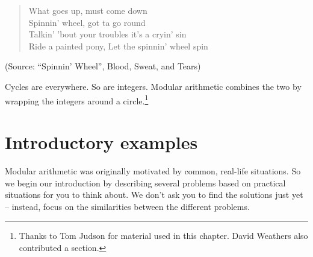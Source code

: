 
\begin{verse}
What goes up, must come down\\
Spinnin' wheel, got ta go round\\
Talkin' 'bout your troubles it's a cryin' sin\\
Ride a painted pony, Let the spinnin' wheel spin
\end{verse}
(Source:  ``Spinnin' Wheel'', Blood, Sweat, and Tears)
\bigskip

Cycles are everywhere. So are integers. Modular arithmetic combines the two by wrapping the integers around a circle.\footnote{Thanks to Tom Judson for material used in this chapter.  David Weathers also contributed a section.}

\section{Introductory examples}\label{sec:Mod.1}
Modular arithmetic was originally motivated by common, real-life situations. So we begin our introduction by describing several problems  based on practical situations for you to think about. We don't ask you to find the solutions just yet -- instead, focus on the similarities between the different problems. 

